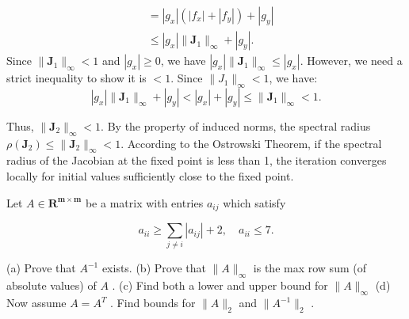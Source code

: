 \begin{solution}
\begin{enumerate}
\begin{align*}
    &= |g_x| (|f_x| + |f_y|) + |g_y| \\
    &\leq |g_x| \|\mathbf{J}_1\|_\infty + |g_y|.
    \end{align*}
    Since $\|\mathbf{J}_1\|_\infty < 1$ and $|g_x| \geq 0$, we have $|g_x| \|\mathbf{J}_1\|_\infty \leq |g_x|$. However, we need a strict inequality to show it is $<1$. Since $\|J_1\|_\infty < 1$, we have:
    \[ |g_x| \|\mathbf{J}_1\|_\infty + |g_y| < |g_x| + |g_y| \leq \|\mathbf{J}_1\|_\infty < 1. \]
\end{enumerate}
Thus, $\|\mathbf{J}_2\|_\infty < 1$. By the property of induced norms, the spectral radius $\rho(\mathbf{J}_2) \leq \|\mathbf{J}_2\|_\infty < 1$. According to the Ostrowski Theorem, if the spectral radius of the Jacobian at the fixed point is less than 1, the iteration converges locally for initial values sufficiently close to the fixed point.
\end{solution}

\begin{exercise}
\label{applied:2022:3}
Let $A \in \mathbf { R } ^ { \mathbf { m } \times \mathbf { m } }$ be a matrix with entries $a _ { i j }$ which satisfy

\[
a _ {i i} \geq \sum_ {j \neq i} | a _ {i j} | + 2, \quad a _ {i i} \leq 7.
\]

(a) Prove that $A ^ { - 1 }$ exists.   
(b) Prove that $\| A \| _ { \infty }$ is the max row sum (of absolute values) of $A$ .   
(c) Find both a lower and upper bound for $\| A \| _ { \infty }$   
(d) Now assume $A = A ^ { T }$ . Find bounds for $\| A \| _ { 2 }$ and $\| A ^ { - 1 } \| _ { 2 }$ .
\end{exercise}

